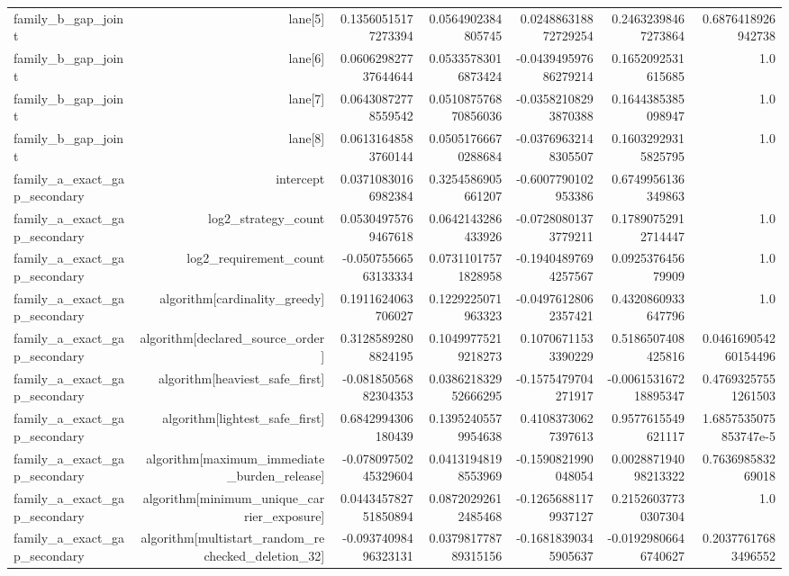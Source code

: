 {\begin{longtable}{lrrrrrr}
family\_b\_gap\_joint & lane[5] & 0.13560515177273394 & 0.0564902384805745 & 0.024886318872729254 & 0.24632398467273864 & 0.6876418926942738 \\
family\_b\_gap\_joint & lane[6] & 0.060629827737644644 & 0.05335783016873424 & -0.043949597686279214 & 0.1652092531615685 & 1.0 \\
family\_b\_gap\_joint & lane[7] & 0.06430872778559542 & 0.051087576870856036 & -0.03582108293870388 & 0.1644385385098947 & 1.0 \\
family\_b\_gap\_joint & lane[8] & 0.06131648583760144 & 0.05051766670288684 & -0.03769632148305507 & 0.16032929315825795 & 1.0 \\
family\_a\_exact\_gap\_secondary & intercept & 0.03710830166982384 & 0.3254586905661207 & -0.6007790102953386 & 0.6749956136349863 &  \\
family\_a\_exact\_gap\_secondary & log2\_strategy\_count & 0.05304975769467618 & 0.0642143286433926 & -0.07280801373779211 & 0.17890752912714447 & 1.0 \\
family\_a\_exact\_gap\_secondary & log2\_requirement\_count & -0.05075566563133334 & 0.07311017571828958 & -0.19404897694257567 & 0.092537645679909 & 1.0 \\
family\_a\_exact\_gap\_secondary & algorithm[cardinality\_greedy] & 0.1911624063706027 & 0.1229225071963323 & -0.04976128062357421 & 0.4320860933647796 & 1.0 \\
family\_a\_exact\_gap\_secondary & algorithm[declared\_source\_order] & 0.31285892808824195 & 0.10499775219218273 & 0.10706711533390229 & 0.5186507408425816 & 0.046169054260154496 \\
family\_a\_exact\_gap\_secondary & algorithm[heaviest\_safe\_first] & -0.08185056882304353 & 0.038621832952666295 & -0.1575479704271917 & -0.006153167218895347 & 0.47693257551261503 \\
family\_a\_exact\_gap\_secondary & algorithm[lightest\_safe\_first] & 0.6842994306180439 & 0.13952405579954638 & 0.41083730627397613 & 0.9577615549621117 & 1.6857535075853747e-5 \\
family\_a\_exact\_gap\_secondary & algorithm[maximum\_immediate\_burden\_release] & -0.07809750245329604 & 0.04131948198553969 & -0.1590821990048054 & 0.002887194098213322 & 0.763698583269018 \\
family\_a\_exact\_gap\_secondary & algorithm[minimum\_unique\_carrier\_exposure] & 0.044345782751850894 & 0.08720292612485468 & -0.12656881179937127 & 0.21526037730307304 & 1.0 \\
family\_a\_exact\_gap\_secondary & algorithm[multistart\_random\_rechecked\_deletion\_32] & -0.09374098496323131 & 0.037981778789315156 & -0.16818390345905637 & -0.01929806646740627 & 0.20377617683496552 \\

\end{longtable}}
